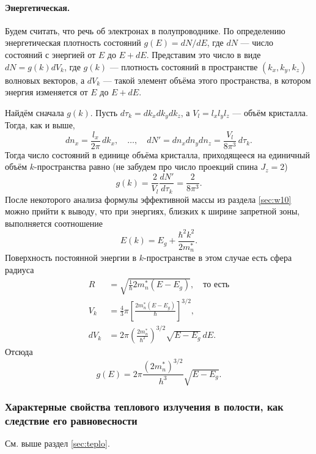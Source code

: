 \paragraph{Энергетическая.}
Будем считать, что речь об электронах в полупроводнике. По определению энергетическая плотность состояний $ g(E) = dN/dE $, где $ dN $ ---
число состояний с энергией от $ E $ до $ E + dE $. Представим это число в виде $
dN = g(k)dV_k $, где $ g(k) $ --- плотность состояний в пространстве $ (k_x,
k_y, k_z) $ волновых векторов, а $ dV_k $ --- такой элемент объёма этого
пространства, в котором энергия изменяется от $ E $ до $ E + dE $.

Найдём сначала $ g(k) $. Пусть $ d\tau_k = dk_x dk_y dk_z $, а $ V_l = l_xl_yl_z $
--- объём кристалла. Тогда, как и выше, 
\[
   dn_x = \frac{l_x}{2\pi}\,dk_x, \quad \ldots, \quad
    dN' = dn_x dn_y dn_z = \frac{V_l}{8\pi^3}\,d\tau_k.
\]
Тогда число состояний в единице объёма кристалла, приходящееся на единичный
объём $ k $-пространства равно (не забудем про число проекций спина $ J_z
= 2$)
\[
    g(k) = \frac{2}{V_l} \frac{dN'}{d\tau_k} = \frac{2}{8\pi^3}.
\]
После некоторого анализа формулы эффективной массы из раздела \ref{sec:w10}
можно прийти к выводу, что при энергиях, близких к ширине запретной зоны,
выполняется соотношение  
\[
    E(k) = E_g + \frac{\hbar^2 k^2}{2m^\ast_n}.
\]
Поверхность постоянной энергии в $ k $-пространстве в этом случае есть сфера
радиуса
\begin{align*}
  R &= \sqrt{\frac{1}{\hbar}2m^\ast_n(E-E_g)}, \quad\text{то есть}\\
  V_k &= \frac{4}{3}\pi \left[ \frac{2m^\ast_n(E-E_g)}{\hbar} \right]^{3/2},\\
  dV_k &= 2\pi \left( \frac{2m^\ast_n}{\hbar^2} \right)^{3/2} \sqrt{E-E_g}\,dE.
\end{align*}
Отсюда  
\[
  g(E) = 2\pi \frac{(2m^\ast_n)^{3/2}}{h^3} \sqrt{E - E_g}.
\]

\subsubsection{Характерные свойства теплового излучения в полости, как следствие его равновесности}
См. выше раздел \ref{sec:teplo}.




